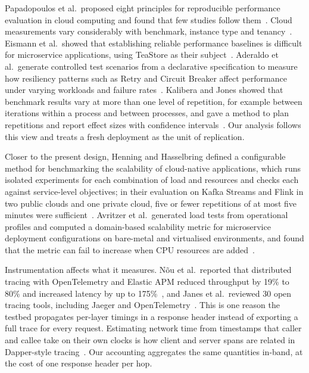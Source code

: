 Papadopoulos et al.\ proposed eight principles for reproducible performance evaluation in cloud computing and
found that few studies follow them~\cite{Papadopoulos2021}. Cloud measurements vary considerably with benchmark,
instance type and tenancy~\cite{Laaber2019,Leitner2016}. Eismann et al.\ showed that establishing reliable performance
baselines is difficult for microservice applications, using TeaStore as their
subject~\cite{Eismann2020}. Aderaldo et al.\ generate controlled test scenarios from a declarative specification to
measure how resiliency patterns such as Retry and Circuit Breaker affect performance under varying workloads and
failure rates~\cite{Aderaldo2025}. Kalibera and Jones showed that benchmark results vary at more than one
level of repetition, for example between iterations within a process and between processes, and gave a method to
plan repetitions and report effect sizes with confidence intervals~\cite{Kalibera2013}. Our analysis follows this
view and treats a fresh deployment as the unit of replication.

Closer to the present design, Henning and Hasselbring defined a configurable method for
benchmarking the scalability of cloud-native applications, which runs isolated experiments for each
combination of load and resources and checks each against service-level objectives; in their
evaluation on Kafka Streams and Flink in two public clouds and one private cloud, five or fewer
repetitions of at most five minutes were sufficient~\cite{Henning2022}. Avritzer et al.\ generated
load tests from operational profiles and computed a domain-based scalability metric for
microservice deployment configurations on bare-metal and virtualised environments, and found that
the metric can fail to increase when CPU resources are added~\cite{Avritzer2020}.

Instrumentation affects what it measures. N\~ou et al.\ reported that distributed tracing with
OpenTelemetry and Elastic APM reduced throughput by 19\% to 80\% and increased latency by up to
175\%~\cite{Nou2025}, and Janes et al.\ reviewed 30 open tracing tools, including Jaeger and
OpenTelemetry~\cite{Janes2023}. This is one reason the testbed propagates per-layer timings in a
response header instead of exporting a full trace for every request. Estimating network time from timestamps that
caller and callee take on their own clocks is how client and server spans are related in Dapper-style
tracing~\cite{Sigelman2010,Kaldor2017}. Our accounting aggregates the same quantities in-band, at the cost of one
response header per hop.

